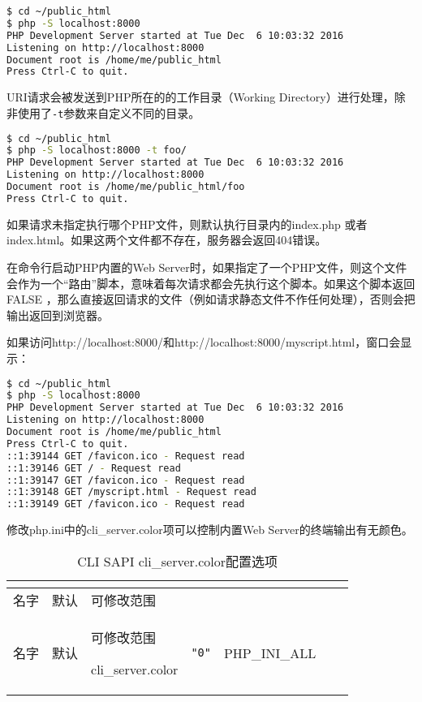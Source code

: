 \begin{lstlisting}[language=bash]
$ cd ~/public_html
$ php -S localhost:8000
PHP Development Server started at Tue Dec  6 10:03:32 2016
Listening on http://localhost:8000
Document root is /home/me/public_html
Press Ctrl-C to quit.
\end{lstlisting}

URI请求会被发送到PHP所在的的工作目录（Working Directory）进行处理，除非使用了\texttt{-t}参数来自定义不同的目录。

\begin{lstlisting}[language=bash]
$ cd ~/public_html
$ php -S localhost:8000 -t foo/
PHP Development Server started at Tue Dec  6 10:03:32 2016
Listening on http://localhost:8000
Document root is /home/me/public_html/foo
Press Ctrl-C to quit.
\end{lstlisting}

如果请求未指定执行哪个PHP文件，则默认执行目录内的index.php 或者 index.html。如果这两个文件都不存在，服务器会返回404错误。

在命令行启动PHP内置的Web Server时，如果指定了一个PHP文件，则这个文件会作为一个“路由”脚本，意味着每次请求都会先执行这个脚本。如果这个脚本返回 FALSE ，那么直接返回请求的文件（例如请求静态文件不作任何处理），否则会把输出返回到浏览器。

如果访问http://localhost:8000/和http://localhost:8000/myscript.html，窗口会显示：

\begin{lstlisting}[language=bash]
$ cd ~/public_html
$ php -S localhost:8000
PHP Development Server started at Tue Dec  6 10:03:32 2016
Listening on http://localhost:8000
Document root is /home/me/public_html
Press Ctrl-C to quit.
::1:39144 GET /favicon.ico - Request read
::1:39146 GET / - Request read
::1:39147 GET /favicon.ico - Request read
::1:39148 GET /myscript.html - Request read
::1:39149 GET /favicon.ico - Request read
\end{lstlisting}

修改php.ini中的cli\_server.color项可以控制内置Web Server的终端输出有无颜色。


\begin{longtable}{|m{60pt}|m{30pt}|m{100pt}|}
\tabularnewline\hline
名字&默认&可修改范围
\endhead

\caption{CLI SAPI cli\_server.color配置选项}\\
\hline
名字&默认&可修改范围
\endfirsthead

\endfoot

\endlastfoot
\hline
cli\_server.color&\texttt{"0"}&PHP\_INI\_ALL\\
\hline
\end{longtable}


